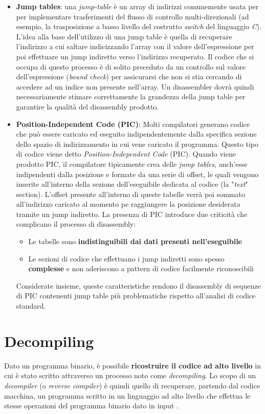 \documentclass[../main.tex]{subfiles}
\begin{document}
\begin{itemize}
    \item \textbf{Jump tables}: una \textit{jump-table} è un array di indirizzi comunemente usata per per implementare trasferimenti del flusso di controllo multi-direzionali (ad esempio, la trasposizione a basso livello del costrutto \textit{switch} del linguaggio \textit{C}).
    L'idea alla base dell'utilizzo di una jump table è quella di recuperare l'indirizzo a cui saltare indicizzando l'array con il valore dell'espressione per poi effettuare un jump indiretto verso l'indirizzo recuperato.
    Il codice che si occupa di questo processo è di solito preceduto da un controllo sul valore dell'espressione (\textit{bound check}) per assicurarsi che non si stia cercando di accedere ad un indice non presente nell'array.
    Un disassembler dovrà quindi necessariamente stimare correttamente la grandezza della jump table per garantire la qualità del disassembly prodotto.
    \item \textbf{Position-Independent Code (PIC)}: Molti compilatori generano codice che può essere caricato ed eseguito indipendentemente dalla specifica sezione dello spazio di indirizzamento in cui vene caricato il programma.
    Questo tipo di codice viene detto \textit{Position-Independent Code} (PIC). Quando viene prodotto PIC, il compilatore tipicamente crea delle \textit{jump tables}, anch'esse indipendenti dalla posizione e formate da una serie di offset, le quali vengono inserite all'interno della sezione dell'eseguibile dedicata al codice (la "\textit{text}" section).
    L'offset presente all'interno di queste tabelle verrà poi sommato all'indirizzo caricato al momento pe raggiungere la posizione desiderata tramite un jump indiretto.
    La presenza di PIC introduce due criticità che complicano il processo di disassembly:
    \begin{itemize}
        \item Le tabelle sono \textbf{indistinguibili dai dati presenti nell'eseguibile}
        \item Le sezioni di codice che effettuano i jump indiretti sono spesso \textbf{complesse} e non aderiscono a pattern di codice facilmente riconoscibili
    \end{itemize}
    Considerate insieme, queste caratteristiche rendono il disassembly di sequenze di PIC contenenti jump table più problematiche rispetto all'analisi di codice standard.
\end{itemize}





\section{Decompiling}
Dato un programma binario, è possibile \textbf{ricostruire il codice ad alto livello} in cui è stato scritto attraverso un processo noto come \textit{decompiling}.
Lo scopo di un \textit{decompiler} (o \textit{reverse compiler}) è quindi quello di recuperare, partendo dal codice macchina, un programma scritto in un linguaggio ad alto livello che effettua le stesse
operazioni del programma binario dato in input \cite{Cifuentes1995DecompilationOB}.
\end{document}
